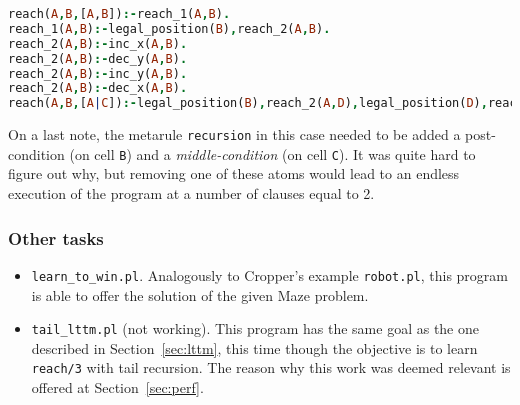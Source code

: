 \begin{lstlisting}[label={lst:res_rfsm},language=Prolog, caption=Result of \texttt{reach\_from\_scratch\_memory.pl}, belowcaptionskip=1cm]
reach(A,B,[A,B]):-reach_1(A,B).
reach_1(A,B):-legal_position(B),reach_2(A,B).
reach_2(A,B):-inc_x(A,B).
reach_2(A,B):-dec_y(A,B).
reach_2(A,B):-inc_y(A,B).
reach_2(A,B):-dec_x(A,B).
reach(A,B,[A|C]):-legal_position(B),reach_2(A,D),legal_position(D),reach(D,B,C).
\end{lstlisting}
On a last note, the metarule \texttt{recursion} in this case needed to be added a post-condition (on cell \texttt{B}) and a \emph{middle-condition}
(on cell \texttt{C}). It was quite hard to figure out why, but removing one of these atoms would lead to an endless execution of the program at a
number of clauses equal to 2.

\subsubsection{Other tasks}
\begin{itemize}
    \item \texttt{learn\_to\_win.pl}. Analogously to Cropper's example \texttt{robot.pl}, this program is able to offer the solution of the given Maze problem.
    \item \texttt{tail\_lttm.pl} (not working). This program has the same goal as the one described in Section~\ref{sec:lttm}, this time though the objective is to learn \texttt{reach/3} with tail recursion. The reason why this work was deemed relevant is offered at Section~\ref{sec:perf}.
\end{itemize}
\newpage